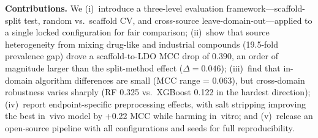 \textbf{Contributions.} We (i)~introduce a three-level evaluation framework---scaffold-split test, random vs.\ scaffold CV, and cross-source leave-domain-out---applied to a single locked configuration for fair comparison; (ii)~show that source heterogeneity from mixing drug-like and industrial compounds (19.5-fold prevalence gap) drove a scaffold-to-LDO MCC drop of 0.390, an order of magnitude larger than the split-method effect ($\Delta = 0.046$); (iii)~find that in-domain algorithm differences are small (MCC range = 0.063), but cross-domain robustness varies sharply (RF 0.325 vs.\ XGBoost 0.122 in the hardest direction); (iv)~report endpoint-specific preprocessing effects, with salt stripping improving the best in~vivo model by +0.22 MCC while harming in~vitro; and (v)~release an open-source pipeline with all configurations and seeds for full reproducibility.
